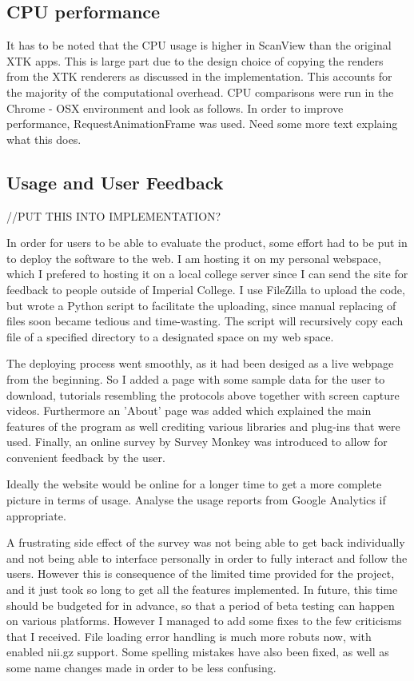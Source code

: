 \documentclass[a4paper,11pt,titlepage]{article}
\begin{document}
\subsection{CPU performance}

It has to be noted that the CPU usage is higher in ScanView than the original XTK apps. This is large part due to the design choice of copying the renders from the XTK renderers as discussed in the implementation. This accounts for the majority of the computational overhead. CPU comparisons were run in the Chrome - OSX environment and look as follows.
In order to improve performance, RequestAnimationFrame was used. Need some more text explaing what this does.



\subsection{Usage and User Feedback}

//PUT THIS INTO IMPLEMENTATION?

In order for users to be able to evaluate the product, some effort had to be put in to deploy the software to the web. I am hosting it on my personal webspace, which I prefered to hosting it on a local college server since I can send the site for feedback to people outside of Imperial College. I use FileZilla to upload the code, but wrote a Python script to facilitate the uploading, since manual replacing of files soon became tedious and time-wasting. The script will recursively copy each file of a specified directory to a designated space on my web space.

The deploying process went smoothly, as it had been desiged as a live webpage from the beginning. So I added a page with some sample data for the user to download, tutorials resembling the protocols above together with screen capture videos. Furthermore an 'About' page was added which explained the main features of the program as well crediting various libraries and plug-ins that were used. Finally, an online survey by Survey Monkey was introduced to allow for convenient feedback by the user.

Ideally the website would be online for a longer time to get a more complete picture in terms of usage.
Analyse the usage reports from Google Analytics if appropriate.

A frustrating side effect of the survey
was not being able to get back individually and not being able to interface personally in order to fully interact and follow the users. However this is consequence of the limited time provided for the project, and it just took so long to get all the features implemented. In future, this time should be budgeted for in advance, so that a period of beta testing can happen on various platforms.
However I managed to add some fixes to the few criticisms that I received. File loading error handling is much more robuts now, with enabled nii.gz support. Some spelling mistakes have also been fixed, as well as some name changes made in order to be less confusing.
\end{document}
